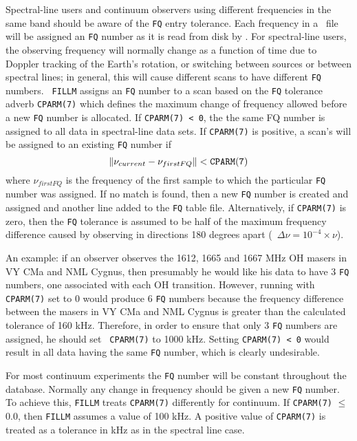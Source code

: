       Spectral-line users and continuum observers using different
frequencies in the same band should be aware of the {\tt FQ} entry
tolerance.  Each frequency in a \uv\ file will be assigned an {\tt FQ}
number as it is read from disk by \hbox{{\tt {}}}.  For
spectral-line users, the observing frequency will normally change as a
function of time due to Doppler tracking of the Earth's rotation, or
switching between sources or between spectral lines; in general, this
will cause different scans to have different {\tt FQ} numbers.  {\tt
FILLM} assigns an {\tt FQ} number to a scan based on the {\tt FQ}
tolerance adverb {\tt CPARM(7)} which defines the maximum change of
frequency allowed before a new {\tt FQ} number is allocated.  If
{\tt CPARM(7) < 0}, the the same FQ number is assigned to all data in
spectral-line data sets.  If {\tt CPARM(7)} is positive, a scan's
 will be assigned to an existing {\tt FQ} number if
$$ \| \nu_{current} - \nu_{firstFQ} \| < {\tt CPARM(7)} $$
where $\nu_{firstFQ}$ is the frequency of the first sample to which
the particular {\tt FQ} number was assigned.  If no match is found,
then a new {\tt FQ} number is created and assigned and another line
added to the {\tt FQ} table file.  Alternatively, if {\tt CPARM(7)} is
zero, then the {\tt FQ} tolerance is assumed to be half of the
maximum frequency difference caused by observing in directions 180
degrees apart (\ie\ $\Delta\nu = 10^{-4}\times \nu$).

     An example: if an observer observes the 1612, 1665 and 1667 MHz
OH masers in VY CMa and NML Cygnus, then presumably he would like his
data to have 3 {\tt FQ} numbers, one associated with each OH
transition.  However, running {\tt {}} with {\tt CPARM(7)}
set to $0$ would produce 6 {\tt FQ} numbers because the frequency
difference between the masers in VY CMa and NML Cygnus is greater than
the calculated tolerance of 160 kHz.  Therefore, in order to ensure
that only 3 {\tt FQ} numbers are assigned, he should set {\tt
CPARM(7)} to 1000 kHz.  Setting {\tt CPARM(7) < 0} would result in all
data having the same {\tt FQ} number, which is clearly undesirable.

     For most continuum experiments the {\tt FQ} number will be
constant throughout the database.  Normally any change in frequency
should be given a new {\tt FQ} number.  To achieve this, {\tt FILLM}
treats {\tt CPARM(7)} differently for continuum.  If {\tt CPARM(7)}
$\leq$ 0.0, then {\tt FILLM} assumes a value of 100 kHz.  A positive
value of {\tt CPARM(7)} is treated as a tolerance in kHz as in the
spectral line case.


